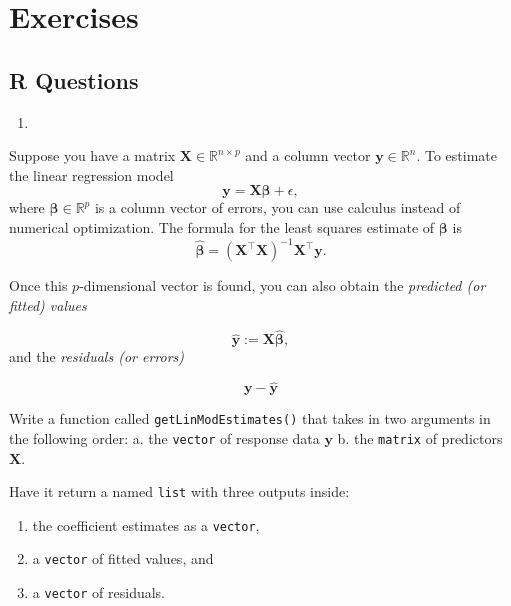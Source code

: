 \documentclass[
  12pt,
  krantz2]{krantz}
\providecommand{\tightlist}{%
  \setlength{\itemsep}{0pt}\setlength{\parskip}{0pt}}
\begin{document}
\hypertarget{exercises-4}{%
\section{Exercises}\label{exercises-4}}

\hypertarget{r-questions-4}{%
\subsection{R Questions}\label{r-questions-4}}

\begin{enumerate}
\def\labelenumi{\arabic{enumi}.}
\tightlist
\item
\end{enumerate}

Suppose you have a matrix \(\mathbf{X} \in \mathbb{R}^{n \times p}\) and a column vector \(\mathbf{y} \in \mathbb{R}^{n}\). To estimate the linear regression model
\begin{equation} 
\mathbf{y} = \mathbf{X}\boldsymbol{\beta} + \epsilon,
\end{equation}
where \(\boldsymbol{\beta} \in \mathbb{R}^p\) is a column vector of errors, you can use calculus instead of numerical optimization. The formula for the least squares estimate of \(\boldsymbol{\beta}\) is
\begin{equation} 
\hat{\boldsymbol{\beta}} = (\mathbf{X}^\intercal \mathbf{X})^{-1} \mathbf{X}^\intercal \mathbf{y}.
\end{equation}

Once this \(p\)-dimensional vector is found, you can also obtain the \emph{predicted (or fitted) values}

\begin{equation} 
\hat{\mathbf{y}} := \mathbf{X}\hat{\boldsymbol{\beta}},
\end{equation}
and the \emph{residuals (or errors)}

\begin{equation} 
\mathbf{y} - \hat{\mathbf{y}}
\end{equation}

Write a function called \texttt{getLinModEstimates()} that takes in two arguments in the following order:
a. the \texttt{vector} of response data \(\mathbf{y}\)
b. the \texttt{matrix} of predictors \(\mathbf{X}\).

Have it return a named \texttt{list} with three outputs inside:

\begin{enumerate}
\def\labelenumi{\alph{enumi}.}
\tightlist
\item
  the coefficient estimates as a \texttt{vector},
\item
  a \texttt{vector} of fitted values, and
\item
  a \texttt{vector} of residuals.
\end{enumerate}
\end{document}
